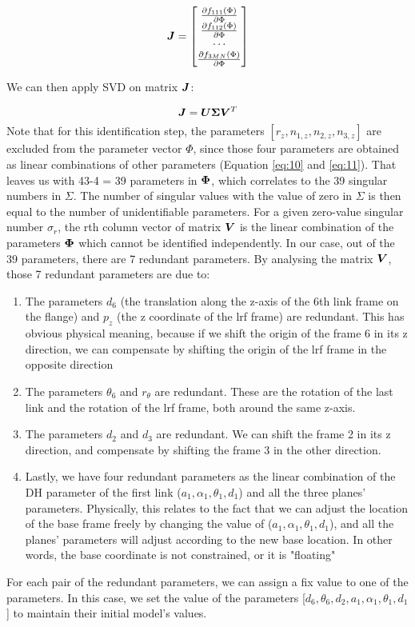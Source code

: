 \renewcommand\arraystretch{1.5}
\begin{equation}
\vb*{J} = \begin{bmatrix}
 \frac{\partial f_{111}(\Phi)}{\partial\Phi}\\
 \frac{\partial f_{112}(\Phi)}{\partial\Phi}\\
 \cdots \\
 \frac{\partial f_{3MN}(\Phi)}{\partial\Phi}\\
	\end{bmatrix}
\end{equation}

We can then apply SVD on matrix $\vb*{J}$:

\begin{equation}
 \vb*{J} = \vb*{U}\vb*{\Sigma}\vb*{V}^T
\end{equation}
Note that for this identification step, the parameters $[r_z, n_{1,z}, n_{2,z}, n_{3,z}]$ are excluded from the parameter vector $\Phi$, since those four parameters are obtained as linear combinations of other parameters (Equation \eqref{eq:10} and \eqref{eq:11}). That leaves us with 43-4 = 39 parameters in $\vb*{\Phi}$, which correlates to the 39 singular numbers in $\Sigma$. The number of singular values with the value of zero in $\Sigma$ is then equal to the number of unidentifiable parameters. For a given zero-value singular number $\sigma_r$, the rth column vector of matrix $\vb*{V}$ is the linear combination of the parameters $\vb*{\Phi}$ which cannot be identified independently. 
In our case, out of the 39 parameters, there are 7 redundant parameters. By analysing the matrix $\vb*{V}$, those 7 redundant parameters are due to:
\begin{enumerate}
\item The parameters $d_6$ (the translation along the z-axis of the 6th link frame on the flange) and $p_z$ (the z coordinate of the \ac{lrf} frame) are redundant. This has obvious physical meaning, because if we shift the origin of the frame 6 in its z direction, we can compensate by shifting the origin of the \ac{lrf} frame in the opposite direction
\item The parameters $\theta_6$ and $r_\theta$ are redundant. These are the rotation of the last link and the rotation of the \ac{lrf} frame, both around the same z-axis. 
\item The parameters $d_2$ and $d_3$ are redundant. We can shift the frame 2 in its z direction, and compensate by shifting the frame 3 in the other direction. 
\item Lastly, we have four redundant parameters as the linear combination of the DH parameter of the first link ($a_1, \alpha_1, \theta_1, d_1$) and all the three planes' parameters. Physically, this relates to the fact that we can adjust the location of the base frame freely by changing the value of ($a_1, \alpha_1, \theta_1, d_1$), and all the planes' parameters will adjust according to the new base location. In other words, the base coordinate is not constrained, or it is "floating"
\end{enumerate}

For each pair of the redundant parameters, we can assign a fix value to one of the parameters. In this case, we set the value of the parameters [$d_6, \theta_6, d_2, a_1, \alpha_1, \theta_1, d_1$] to maintain their initial model's values. 

